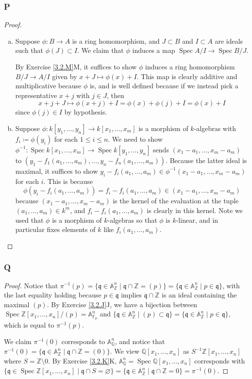 \documentclass{article}
\newcommand{\A}{\mathbb{A}}
\newcommand{\Z}{\mathbb{Z}}
\newcommand{\Q}{\mathbb{Q}}
\newcommand{\F}{\mathbb{F}}
\newcommand{\frkq}{\mathfrak{q}}
\DeclareMathOperator{\Spec}{\mathrm{Spec}}
\let\emptyset\varnothing
\theoremstyle{definition} %
\begin{document}
\subsubsection{P}\label{3.2.P}
\begin{proof}
    \begin{enumerate}[(a)]
        \item Suppose $\phi:B\to A$ is a ring homomorphism, and $J\subset B$ and $I\subset A$ are ideals such that $\phi(J)\subset I$. We claim that $\phi$ induces a map $\Spec A/I\to \Spec B/J$.

        By Exercise \ref{3.2.M}M, it suffices to show $\phi$ induces a ring homomorphism $B/J\to A/I$ given by $x+J\mapsto \phi(x)+I$. This map is clearly additive and multiplicative because $\phi$ is, and is well defined because if we instead pick a representative $x+j$ with $j\in J$, then
        \[
        x+j+J\mapsto \phi(x+j)+I = \phi(x)+\phi(j)+I=\phi(x)+I
        \]
        since $\phi(j)\in I$ by hypothesis.
        \item Suppose $\phi:k[y_1,\dots,y_n]\to k[x_1,\dots,x_m]$ is a morphism of $k$-algebras with $f_i\coloneqq \phi(y_i)$ for each $1\le i \le n$. We need to show $\phi^{-1}:\Spec k[x_1,\dots,x_m]\to \Spec k[y_1,\dots,y_n]$ sends $(x_1-a_1,\dots,x_m-a_m)$ to $(y_1-f_1(a_1,\dots,a_m),\dots,y_n-f_n(a_1,\dots,a_m))$. Because the latter ideal is maximal, it suffices to show $y_i-f_i(a_1,\dots,a_m)\in \phi^{-1}(x_1-a_1,\dots,x_m-a_m)$ for each $i$. This is because
        \[
        \phi(y_i-f_i(a_1,\dots,a_m))=f_i-f_i(a_1,\dots,a_m) \in (x_1-a_1,\dots,x_m-a_m)
        \]
        because $(x_1-a_1,\dots,x_m-a_m)$ is the kernel of the evaluation at the tuple $(a_1,\dots,a_m)\in k^m$, and $f_i-f_i(a_1,\dots,a_m)$ is clearly in this kernel. Note we used that $\phi$ is a morphism of $k$-algebras so that $\phi$ is $k$-linear, and in particular fixes elements of $k$ like $f_i(a_1,\dots,a_m)$.
    \end{enumerate}
\end{proof}
\subsubsection{Q}\label{3.2.Q}
\begin{proof}
    Notice that $\pi^{-1}(p)=\{\frkq \in \A^n_\Z \mid \frkq \cap \Z = (p)\}=\{\frkq \in \A^n_\Z \mid p\in \frkq\}$, with the last equality holding because $p\in \frkq$ implies $\frkq\cap \Z$ is an ideal containing the maximal $(p)$. By Exercise \ref{3.2.J}J, we have a bijection between $\Spec \Z[x_1,\dots,x_n]/(p)=\A^n_{\F_p}$ and $\{ \frkq \in \A^n_\Z \mid (p)\subset \frkq\}=\{ \frkq \in \A^n_\Z \mid p\in \frkq\}$, which is equal to $\pi^{-1}(p)$.

    We claim $\pi^{-1}(0)$ corresponds to $\A^n_\Q$, and notice that $\pi^{-1}(0)=\{\frkq \in \A^n_\Z \mid \frkq \cap \Z = (0)\}$. We view $\Q[x_1,\dots,x_n]$ as $S^{-1}\Z[x_1,\dots,x_n]$ where $S=\Z\setminus 0$. By Exercise \ref{3.2.K}K, $\A^n_\Q = \Spec \Q[x_1,\dots,x_n]$ corresponds with $\{\frkq \in \Spec \Z[x_1,\dots,x_n]\mid \frkq \cap S = \emptyset \} = \{\frkq \in \A^n_\Z \mid \frkq \cap \Z = 0 \} = \pi^{-1}(0)$.
\end{proof}
\end{document}
